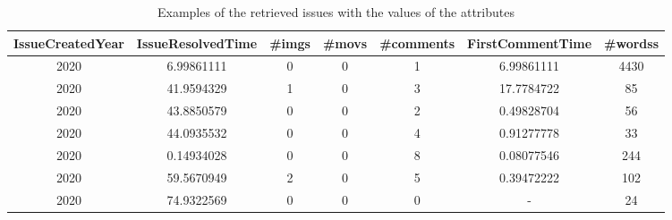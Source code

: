 \begin{table*}[h]
    \begin{center}
    \caption{Examples of the retrieved issues with the values of the attributes}
    \begin{tabular}{c c c c c c c} 
      \toprule
      \textbf{IssueCreatedYear} &
      \textbf{IssueResolvedTime} &
      \textbf{\#imgs} &
      \textbf{\#movs} &
      \textbf{\#comments} &
      \textbf{FirstCommentTime} &
      \textbf{\#wordss} \\
      \midrule
      2020 & 6.99861111 & 0 & 0 & 1 & 6.99861111 & 4430\\
      2020 & 41.9594329 & 1 & 0 & 3 & 17.7784722 & 85\\
      2020 & 43.8850579 & 0 & 0 & 2 & 0.49828704 & 56\\
      2020 & 44.0935532 & 0 & 0 & 4 & 0.91277778 & 33\\
      2020 & 0.14934028 & 0 & 0 & 8 & 0.08077546 & 244\\
      2020 & 59.5670949 & 2 & 0 & 5 & 0.39472222 & 102\\
      2020 & 74.9322569 & 0 & 0 & 0 & -          & 24\\
      \bottomrule
    \end{tabular}
    \label{tab:example-dataset}
    \end{center}
  \end{table*}

